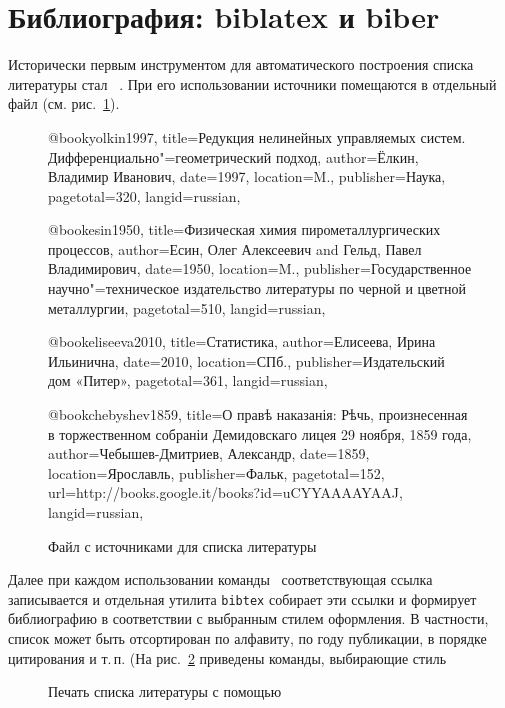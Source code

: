 \documentclass[a4paper,12pt,hyphens]{article}
\newcommand\package[1]{\texttt{#1}}
\newcommand\lcmd[1]{\texttt{#1}}
\DeclareRobustCommand{\myBibTeX}{\BibTeX}
\begin{document}
\section{Библиография: biblatex и biber}
Исторически первым инструментом для автоматического построения
списка литературы стал \BibTeX\ \parencite{ctan-bibtex}. При его
использовании источники
помещаются в отдельный файл (см. рис.~\ref{bibfile}).
\begin{figure}[tp]
\begin{bibtexcode}
@book{yolkin1997,
  title={Редукция нелинейных управляемых систем.
         Дифференциально"=геометрический подход},
  author={Ёлкин, Владимир Иванович},
  date={1997},
  location={M.},
  publisher={Наука},
  pagetotal={320},
  langid={russian},
}

@book{esin1950,
  title={Физическая химия пирометаллургических процессов},
  author={Есин, Олег Алексеевич and Гельд, Павел Владимирович},
  date={1950},
  location={M.},
  publisher={Государственное научно"=техническое издательство
             литературы по черной и цветной металлургии},
  pagetotal={510},
  langid={russian},
}

@book{eliseeva2010,
  title={Статистика},
  author={Елисеева, Ирина Ильинична},
  date={2010},
  location={СПб.},
  publisher={Издательский дом «Питер»},
  pagetotal={361},
  langid={russian},
}

@book{chebyshev1859,
  title={О правѣ наказанія: Рѣчь, произнесенная в торжественном
         собраніи Демидовскаго лицея 29 ноября, 1859 года},
  author={Чебышев-Дмитриев, Александр},
  date={1859},
  location={Ярославль},
  publisher={Фальк},
  pagetotal={152},
  url={http://books.google.it/books?id=uCYYAAAAYAAJ},
  langid={russian},
}
\end{bibtexcode}
\caption{Файл с источниками для списка литературы}\label{bibfile}
\end{figure}
Далее при каждом использовании команды~\lcmd{\cite{key}} соответствующая
ссылка записывается и отдельная утилита \package{bibtex} собирает эти
ссылки и формирует библиографию в соответствии с выбранным стилем оформления.
В частности, список может быть отсортирован по алфавиту, по году
публикации, в порядке цитирования и т.\,п.
(На рис.~\ref{bibliography} приведены команды, выбирающие стиль
\begin{figure}[tp]
\begin{latexcode}


\end{latexcode}
\caption{Печать списка литературы с помощью \myBibTeX}\label{bibliography}
\end{figure}
\end{document}
